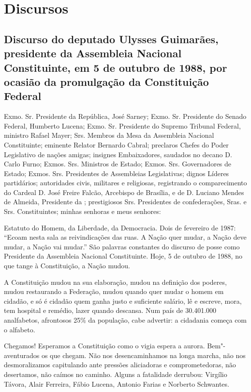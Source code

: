 \part{Discursos}

\chapter*{Discurso do deputado Ulysses Guimarães, presidente da Assembleia
Nacional Constituinte, em 5 de outubro de 1988, por ocasião da
promulgação da Constituição Federal}


Exmo. Sr. Presidente da República, José Sarney; Exmo. Sr. Presidente
do Senado Federal, Humberto Lucena; Exmo. Sr. Presidente do Supremo
Tribunal Federal, ministro Rafael Mayer; Srs. Membros da Mesa da
Assembleia Nacional Constituinte; eminente Relator Bernardo Cabral;
preclaros Chefes do Poder Legislativo de nações amigas; insignes
Embaixadores, saudados no decano D. Carlo Furno; Exmos. Srs. Ministros
de Estado; Exmos. Srs. Governadores de Estado; Exmos. Srs. Presidentes
de Assembleias Legislativas; dignos Líderes partidários; autoridades
civis, militares e religiosas, registrando o comparecimento do Cardeal
D. José Freire Falcão, Arcebispo de Brasília, e de D. Luciano Mendes de
Almeida, Presidente da ; prestigiosos Srs. Presidentes de
confederações, Sras. e Srs. Constituintes; minhas senhoras e meus
senhores:

Estatuto do Homem, da Liberdade, da Democracia. Dois de fevereiro de
1987: ``Ecoam nesta sala as reivindicações das ruas. A Nação quer mudar,
a Nação deve mudar, a Nação vai mudar.'' São palavras constantes do
discurso de posse como Presidente da Assembleia Nacional Constituinte.
Hoje, 5 de outubro de 1988, no que tange à Constituição, a Nação mudou.

A Constituição mudou na sua elaboração, mudou na definição dos poderes,
mudou restaurando a Federação, mudou quando quer mudar o homem em
cidadão, e só é cidadão quem ganha justo e suficiente salário, lê e
escreve, mora, tem hospital e remédio, lazer quando descansa. Num país
de 30.401.000 analfabetos, afrontosos 25\% da população, cabe advertir:
a cidadania começa com o alfabeto.

Chegamos! Esperamos a Constituição como o vigia espera a aurora.
Bem"-aventurados os que chegam. Não nos desencaminhamos na longa marcha,
não nos desmoralizamos capitulando ante pressões aliciadoras e
comprometedoras, não desertamos, não caímos no caminho. Alguns a
fatalidade derrubou: Virgílio Távora, Alair Ferreira, Fábio
Lucena, Antonio Farias e Norberto Schwantes.


